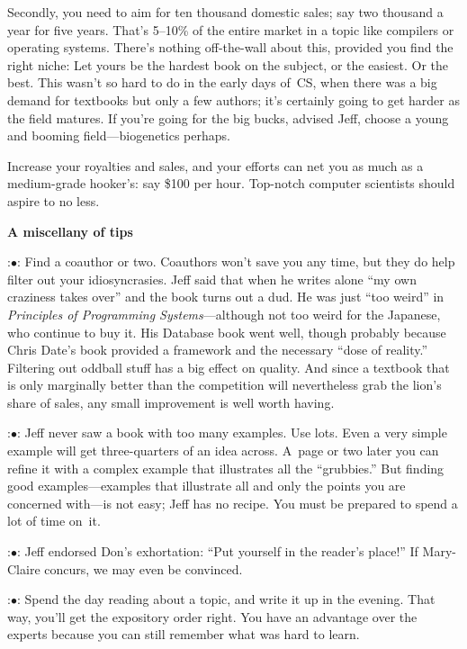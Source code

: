 Secondly, you need to aim for ten thousand domestic sales; say two
thousand a year for five years. That's 5--10\% of the entire market in a
topic like compilers or operating systems. There's nothing
off-the-wall about this, provided you find the right niche: Let yours
be the hardest book on the subject, or the easiest. Or the best. This
wasn't so hard to do in the early days of~CS, when there was a big
demand for textbooks but only a few authors; it's certainly going to
get harder as the field matures. If you're going for the big bucks,
advised Jeff, choose a young and booming field---biogenetics perhaps.

Increase your royalties and sales, and your efforts can net you as
much as a medium-grade hooker's: say \$100 per hour. Top-notch computer
scientists should aspire to no less.

\vfill\eject

{\bf A miscellany of tips}

\display 20pt:$\bullet$:
Find a coauthor or two. Coauthors won't save you any time, but they
do help filter out your idiosyncrasies. Jeff said that when he writes
alone ``my own craziness takes over'' and the book turns out a dud. He
was just ``too weird'' in {\sl Principles of Programming Systems\/}---although
 not too weird for the Japanese, who continue to buy it. His
Database book went well, though probably because Chris Date's book
provided a framework and the necessary ``dose of reality.''  Filtering
out oddball stuff has a big effect on quality. And since a textbook that
is only marginally better than the competition will nevertheless grab
the lion's share of sales, any small improvement is well worth having.

\display 20pt:$\bullet$:
Jeff never saw a book with too many examples. Use lots. Even a very
simple example will get three-quarters of an idea across. A~page or
two later you can refine it with a complex example that illustrates
all the ``grubbies.'' But finding good examples---examples that 
illustrate  all and only the points you are concerned with---is not
easy; Jeff has no recipe. You must be prepared to spend a lot of time
on~it.

\display 20pt:$\bullet$:
Jeff endorsed Don's exhortation: ``Put yourself in the reader's place!''
If Mary-Claire concurs, we may even be convinced.

\display 20pt:$\bullet$:
Spend the day reading about a topic, and write it up in the evening.
That way, you'll get the expository order right. You have an advantage
over the experts because you can still remember what was hard to learn.

